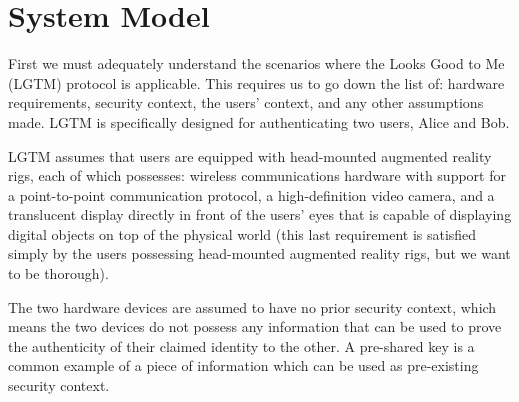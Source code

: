 \documentclass[12pt]{report}
\begin{document}
\section{System Model}
First we must adequately understand the scenarios where the Looks Good to Me (LGTM) protocol is applicable. This requires us to go down the list of: hardware requirements, security context, the users' context, and any other assumptions made. 
LGTM is specifically designed for authenticating two users, Alice and Bob.

LGTM assumes that users are equipped with head-mounted augmented reality rigs, each of which possesses: wireless communications hardware with support for a point-to-point communication protocol, a high-definition video camera, and a translucent display directly in front of the users' eyes that is capable of displaying digital objects on top of the physical world (this last requirement is satisfied simply by the users possessing head-mounted augmented reality rigs, but we want to be thorough). 

The two hardware devices are assumed to have no prior security context, which means the two devices do not possess any information that can be used to prove the authenticity of their claimed identity to the other. A pre-shared key is a common example of a piece of information which can be used as pre-existing security context.
\end{document}
